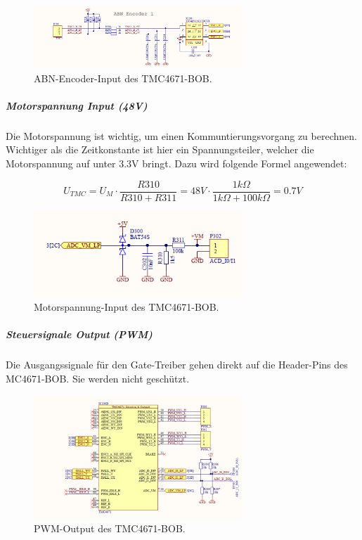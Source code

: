 \begin{figure}[h!]
	\centering
	\includegraphics[width=0.7\textwidth]{graphics/TMC4671_ABN_Encoder_BOB_Schematic}
	\caption{ABN-Encoder-Input des TMC4671-BOB.}
	\label{fig:Schema_ABN_Encoder_FOC_Treiber}
\end{figure} 

\subparagraph{Motorspannung Input (48V)}

Die Motorspannung ist wichtig, um einen Kommuntierungsvorgang zu berechnen. Wichtiger als die Zeitkonstante ist hier ein Spannungsteiler, welcher die Motorspannung auf unter 3.3V bringt. Dazu wird folgende Formel angewendet:

\begin{equation}
U_{TMC} = U_M \cdot \frac{R310}{R310 + R311} = 48V \cdot \frac{1k\Omega}{1k\Omega + 100k\Omega} = 0.7V
\end{equation}

\begin{figure}[h!]
	\centering
	\includegraphics[width=0.7\textwidth]{graphics/TMC4671_Motorspannung_BOB_Schematic}
	\caption{Motorspannung-Input des TMC4671-BOB.}
	\label{fig:Schema_Motorspannung_FOC_Treiber}
\end{figure} 

\subparagraph{Steuersignale Output (PWM)}

Die Ausgangssignale für den Gate-Treiber gehen direkt auf die Header-Pins des MC4671-BOB. Sie werden nicht geschützt.

\begin{figure}[h!]
	\centering
	\includegraphics[width=0.7\textwidth]{graphics/TMC4671_PWM_BOB_Schematic}
	\caption{PWM-Output des TMC4671-BOB.}
	\label{fig:Schema_PWM_FOC_Treiber}
\end{figure} 

